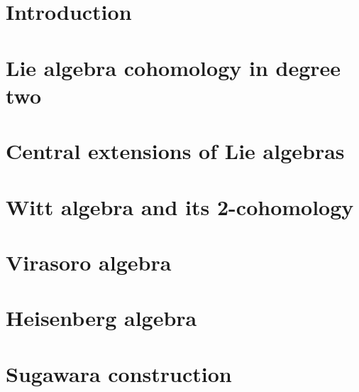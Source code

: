 %

\chapter{Introduction}


\chapter{Lie algebra cohomology in degree two}


\chapter{Central extensions of Lie algebras}


\chapter{Witt algebra and its 2-cohomology}


\chapter{Virasoro algebra}


\chapter{Heisenberg algebra}


\chapter{Sugawara construction}

